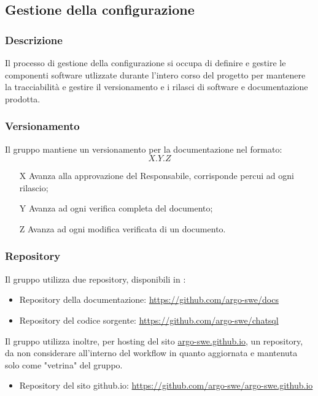 \subsection{Gestione della configurazione}

\subsubsection{Descrizione}
Il processo di gestione della configurazione si occupa di definire e gestire le componenti software utlizzate durante l'intero corso del progetto per mantenere la tracciabilità e gestire il versionamento e i rilasci di software e documentazione prodotta.\\

\subsubsection{Versionamento}
Il gruppo mantiene un versionamento per la documentazione nel formato:
\[ X.Y.Z \]
\begin{itemize}
  \item[X] Avanza alla approvazione del Responsabile, corrisponde percui ad ogni rilascio;
  \item[Y] Avanza ad ogni verifica completa del documento;
  \item[Z] Avanza ad ogni modifica verificata di un documento.
\end{itemize}

\subsubsection{Repository}
Il gruppo utilizza due repository, disponibili in :
\begin{itemize}
  \item Repository della documentazione: \href{https://github.com/argo-swe/docs}{https://github.com/argo-swe/docs}
  \item Repository del codice sorgente: \href{https://github.com/argo-swe/chatsql}{https://github.com/argo-swe/chatsql}
\end{itemize}
Il gruppo utilizza inoltre, per hosting del sito \href{https://argo-swe.github.io}{argo-swe.github.io}, un repository, da non considerare all'interno del workflow in quanto aggiornata e mantenuta solo come "vetrina" del gruppo.
\begin{itemize}
  \item Repository del sito github.io: \href{https://github.com/argo-swe/argo-swe.github.io}{https://github.com/argo-swe/argo-swe.github.io}
\end{itemize}

